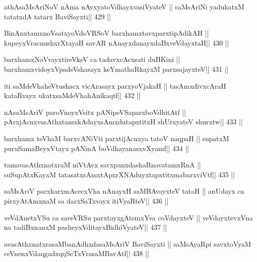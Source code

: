 \begin{shl}
athAsaMsAriNoV nAma nAyxyatoV\s dhayxvasiVyateV ||
saMsAriNi yadukatxM tatatxdA tatarx BaviSayxti\hfill || 429 ||
\end{shl}

\begin{shl}
BinAnxtamxnoVsatxyoVdoVRSoV barxhamxtavxparxtipAdikAH ||
kupeyxVracnushxrXtayaH savAR nAnayxdanayxdaBxveVdayxtaH\hfill || 430 ||
\end{shl}

\begin{shl}
barxhamxNoV\s vayxtireVkeV ca tadavxcAcxsati duHKini ||
barxhamxvidoyxVpadeVshasayx keYmathaRkayxM parxsajayxteV\hfill || 431 ||
\end{shl}

\begin{shl}
iti saMdeVhaheVtushacx vicArasayx parxyoVjakaH ||
tasAmxdivxcAraH kataRvayx ukatxsaMdeVhahAnikaqtf\hfill || 432 ||
\end{shl}

\begin{shl}
nAsaMsAriV paroV\s noyxV\s sitx pANipeVSaparxboVdhitAtf ||
pArxjAcnxvasAthxtamxkAdayxsAmxdutapxtitxH shUrxyateV shurxtw\hfill || 433 ||
\end{shl}

\begin{shl}
barxhamx teV\s haM barxvANiVti parxtijAcnxya tatoV naqpaH ||
supatxM puruSamaBeyxVtayx pANinA boVdhayanasxvXyamf\hfill || 434 ||
\end{shl}

\begin{shl}
tamavasAthxnatxraM niVtAvx savxpanxdashaRnavatamxRnA ||
suSupAtxKayxM tatasatxsAmxtApxrXNAduyxtapxtitxmabarxviVtf\hfill || 435 ||
\end{shl}

\begin{shl}
saMsAriV parxkarxmAcecxVha nAnayxH saMBAvayxteV tataH ||
anUdayx ca pirxyAtAmxnaM sa darxSaTxvayx itiVyaRteV\hfill || 436 ||
\end{shl}

\begin{shl}
veVdAnetxVSu ca saveVRSu parxtayxgAtemxYva coVdayxteV ||
veVdayxtevxVna na tadiBxnanxM pasheyxVditayxBidhiVyateV\hfill || 437 ||
\end{shl}

\begin{shl}
avasAthxnatxrasaMbanAdhxdasaMsAriV BaviSayxti ||
saMsAyaRpi savxtoV\s yaM ceVnenxVdaqgadxqqSeTxVrasaMBavAtf\hfill || 438 ||
\end{shl}

